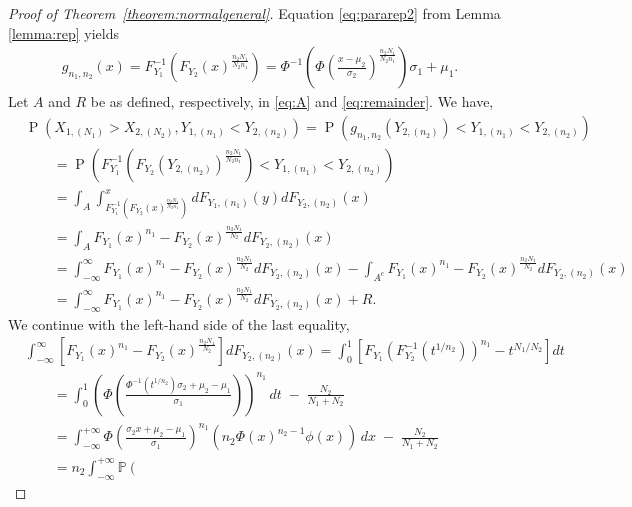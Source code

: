 \documentclass[12pt]{article}
\DeclareMathOperator*{\Prob}{P}
\begin{document}
\begin{proof}[Proof of Theorem~\ref{theorem:normalgeneral}]
Equation \ref{eq:pararep2} from Lemma \ref{lemma:rep} yields
\begin{align*}
	g_{n_1, n_2}(x) = F_{Y_1}^{-1}\left(F_{Y_2}(x)^{\frac{n_2N_1}{N_2n_1}}\right) = \Phi^{-1}\left(\Phi\left(\frac{x-\mu_2}{\sigma_2}\right)^\frac{n_2N_1}{N_2n_1}\right)\sigma_1 +\mu_1.
\end{align*}
Let $A$ and $R$ be as defined, respectively, in \eqref{eq:A} and \eqref{eq:remainder}. We have,
\begin{align*}
  &\Prob\left(X_{1,(N_1)} > X_{2,(N_2)}, Y_{1,(n_1)} < Y_{2,(n_2)}\right) = \Prob\left( g_{n_1,n_2}\left(Y_{2,(n_2)}\right) < Y_{1,(n_1)}  < Y_{2,(n_2)}\right)\\
	&\qquad= \Prob\left( F_{Y_1}^{-1}\left(F_{Y_2}(Y_{2,(n_2)})^{\frac{n_2N_1}{N_2n_1}}\right) < Y_{1,(n_1)}  < Y_{2,(n_2)}\right)\\
	&\qquad= \int_A \int_{F_{Y_1}^{-1}\left(F_{Y_2}(x)^{\frac{n_2N_1}{N_2n_1}}\right)}^{x} d F_{Y_1, (n_1)}(y) d F_{Y_2, (n_2)}(x)\\	
	&\qquad= \int_{A} F_{Y_1}(x)^{n_1} - F_{Y_2}(x)^{\frac{n_2N_1}{N_2}}d F_{Y_2, (n_2)}(x) \\
	&\qquad= \int_{-\infty}^{\infty} F_{Y_1}(x)^{n_1} - F_{Y_2}(x)^{\frac{n_2N_1}{N_2}}d F_{Y_2, (n_2)}(x) - \int_{A^c} F_{Y_1}(x)^{n_1} - F_{Y_2}(x)^{\frac{n_2N_1}{N_2}}d F_{Y_2, (n_2)}(x) \\
	&\qquad= \int_{-\infty}^{\infty} F_{Y_1}(x)^{n_1} - F_{Y_2}(x)^{\frac{n_2N_1}{N_2}}d F_{Y_2, (n_2)}(x) + R.
\end{align*}
We continue with the left-hand side of the last equality,	
\begin{align*}
&\int_{-\infty}^{\infty} \left[ F_{Y_1}(x)^{n_1} - F_{Y_2}(x)^{\frac{n_2N_1}{N_2}} \right] d F_{Y_2,(n_2)}(x) 
= \int_0^1 \left[ F_{Y_1}\!\left( F_{Y_2}^{-1}(t^{1/n_2}) \right)^{n_1} - t^{N_1/N_2} \right] dt\\[6pt]
&\qquad= \int_{0}^{1} \left( \Phi\!\left(\frac{\Phi^{-1}(t^{1/n_2})\sigma_2 + \mu_2 - \mu_1}{\sigma_1}\right) \right)^{n_1} \, dt \;-\; \frac{N_2}{N_1 + N_2} \\[6pt]
&\qquad= \int_{-\infty}^{+\infty} 
\Phi\!\left(\frac{\sigma_2 x + \mu_2 - \mu_1}{\sigma_1}\right)^{n_1} 
\left( n_2 \Phi(x)^{n_2-1} \phi(x) \right)\, dx \;-\; \frac{N_2}{N_1 + N_2} \\[8pt]
&\qquad= n_2 \int_{-\infty}^{+\infty}
\mathbb{P}\!\left(
\begin{array}{l}

\end{array}
\end{align*}
\end{proof}
\end{document}

